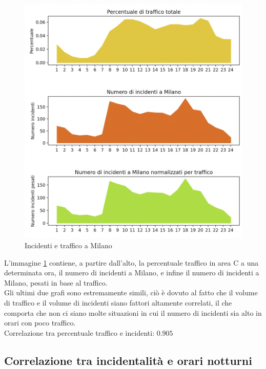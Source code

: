 \documentclass[a4paper]{report}
\begin{document}
\begin{figure}
    \includegraphics[width=\linewidth]{../src/area_c/incidenti_traffico_ora.png}
    \caption{Incidenti e traffico a Milano}
    \label{fig:incidenti-traffico-ora}
\end{figure}

L'immagine \ref{fig:incidenti-traffico-ora} contiene, a partire dall'alto, 
la percentuale traffico in area C a una determinata ora, il numero di incidenti a Milano, 
e infine il numero di incidenti a Milano, pesati in base al traffico.\\
Gli ultimi due grafi sono estremamente simili, ciò è dovuto al fatto che il volume di traffico e 
il volume di incidenti siano fattori altamente correlati, il che comporta che non ci siano molte 
situazioni in cui il numero di incidenti sia alto in orari con poco traffico.\\
Correlazione tra percentuale traffico e incidenti: $0.905$


\subsection{Correlazione tra incidentalità e orari notturni}
\end{document}
